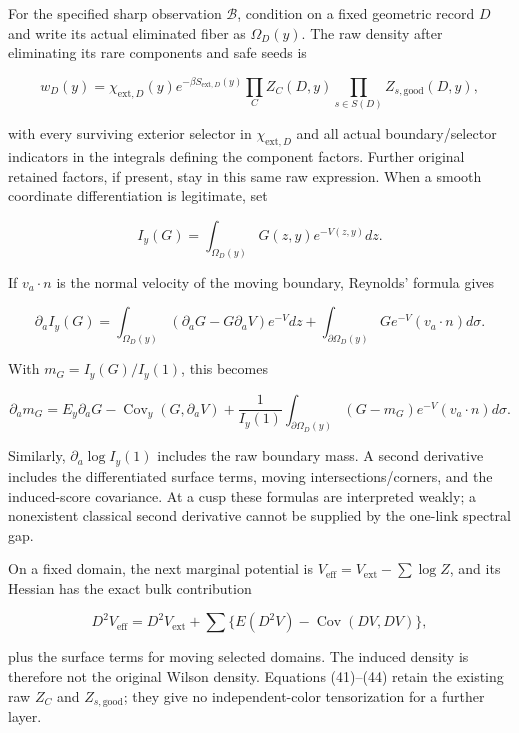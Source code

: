 \documentclass[
  11pt,
]{article}
\begin{document}
For the specified sharp observation \(\mathcal B\), condition on a fixed
geometric record \(D\) and write its actual eliminated fiber as
\(\Omega_D(y)\). The raw density after eliminating its rare components
and safe seeds is

\[
w_D(y)=\chi_{\mathrm{ext},D}(y)e^{-\beta S_{\mathrm{ext},D}(y)}
        \prod_C Z_C(D,y)\prod_{s\in S(D)}Z_{s,\mathrm{good}}(D,y),
                                                        \tag{41}
\]

with every surviving exterior selector in \(\chi_{\mathrm{ext},D}\) and
all actual boundary/selector indicators in the integrals defining the
component factors. Further original retained factors, if present, stay
in this same raw expression. When a smooth coordinate differentiation is
legitimate, set

\[
 I_y(G)=\int_{\Omega_D(y)}G(z,y)e^{-V(z,y)}dz.
\]

If \(v_a\cdot n\) is the normal velocity of the moving boundary,
Reynolds' formula gives

\[
 \partial_a I_y(G)=
 \int_{\Omega_D(y)}(\partial_aG-G\partial_aV)e^{-V}dz
 +\int_{\partial\Omega_D(y)}G e^{-V}(v_a\cdot n)d\sigma.
                                                        \tag{42}
\]

With \(m_G=I_y(G)/I_y(1)\), this becomes

\[
 \partial_am_G=
 E_y\partial_aG-\operatorname{Cov}_y(G,\partial_aV)
 +\frac1{I_y(1)}\int_{\partial\Omega_D(y)}
        (G-m_G)e^{-V}(v_a\cdot n)d\sigma.         \tag{43}
\]

Similarly, \(\partial_a\log I_y(1)\) includes the raw boundary mass. A
second derivative includes the differentiated surface terms, moving
intersections/corners, and the induced-score covariance. At a cusp these
formulas are interpreted weakly; a nonexistent classical second
derivative cannot be supplied by the one-link spectral gap.

On a fixed domain, the next marginal potential is
\(V_{\mathrm{eff}}=V_{\mathrm{ext}}-\sum\log Z\), and its Hessian has
the exact bulk contribution

\[
 D^2V_{\mathrm{eff}}
 =D^2V_{\mathrm{ext}}+\sum\{E(D^2V)-\operatorname{Cov}(DV,DV)\},
                                                        \tag{44}
\]

plus the surface terms for moving selected domains. The induced density
is therefore not the original Wilson density. Equations (41)--(44)
retain the existing raw \(Z_C\) and \(Z_{s,\mathrm{good}}\); they give
no independent-color tensorization for a further layer.
\end{document}
